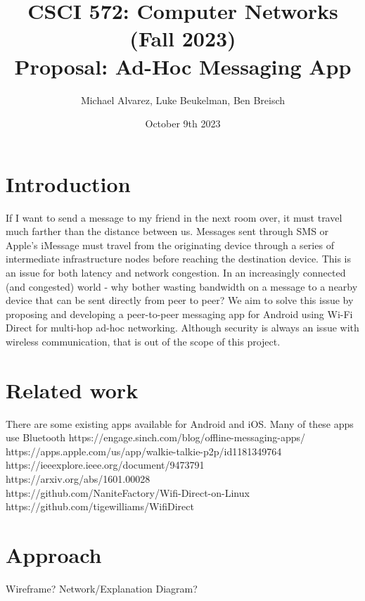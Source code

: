 \documentclass[10pt]{article}
\title{{\normalsize CSCI 572: Computer Networks (Fall 2023)}\\Proposal: Ad-Hoc Messaging App}
\author{Michael Alvarez, Luke Beukelman, Ben Breisch}
\date{October 9th 2023}
\begin{document}
\maketitle

\section{Introduction}
If I want to send a message to my friend in the next room over, it must travel much farther than the distance between us. Messages sent through SMS or Apple's iMessage must travel from the originating device through a series of intermediate infrastructure nodes before reaching the destination device. This is an issue for both latency and network congestion. In an increasingly connected (and congested) world - why bother wasting bandwidth on a message to a nearby device that can be sent directly from peer to peer? We aim to solve this issue by proposing and developing a peer-to-peer messaging app for Android using Wi-Fi Direct for multi-hop ad-hoc networking. Although security is always an issue with wireless communication, that is out of the scope of this project.
\section{Related work}
    There are some existing apps available for Android and iOS. Many of these apps use Bluetooth
    https://engage.sinch.com/blog/offline-messaging-apps/ \\
    https://apps.apple.com/us/app/walkie-talkie-p2p/id1181349764 \\
    https://ieeexplore.ieee.org/document/9473791 \\
    https://arxiv.org/abs/1601.00028 \\
    https://github.com/NaniteFactory/Wifi-Direct-on-Linux \\
    https://github.com/tigewilliams/WifiDirect
  
\section{Approach} %
   Wireframe?
   Network/Explanation Diagram?
\end{document}
